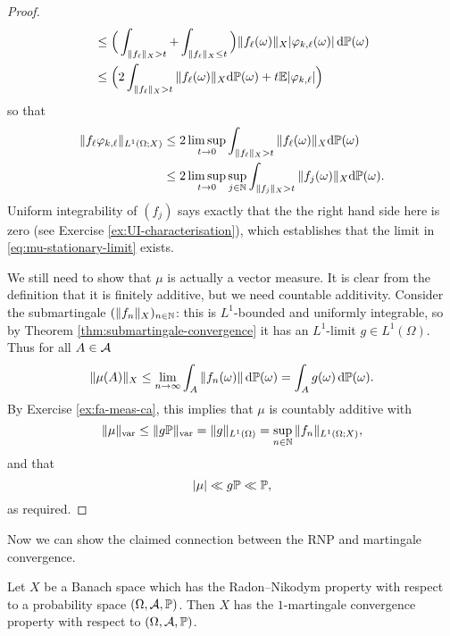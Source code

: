 \begin{proof}
\begin{equation*}
\begin{aligned}
       &\leq \Big( \int_{\|f_{\ell}\|_{X} > t} + \int_{\|f_{\ell}\|_{X} \leq t} \Big) \|f_{\ell}(\omega)\|_{X}|\phi_{k,\ell}(\omega)| \, \dd\P(\omega) \\
       &\leq \Big( 2\int_{\|f_{\ell}\|_{X} > t} \|f_{\ell}(\omega)\|_{X} \dd\P(\omega) + t\E|\phi_{k,\ell}| \Big)
     \end{aligned}
   \end{equation*}
   so that
   \begin{equation*}
     \begin{aligned}
       \|  f_\ell \phi_{k,\ell} \|_{L^1(\Omega;X)}
       &\leq 2\limsup_{t \to 0} \int_{\|f_{\ell}\|_{X} > t} \|f_{\ell}(\omega)\|_{X} \dd\P(\omega) \\
       &\leq 2\limsup_{t \to 0} \sup_{j \in \N}  \int_{\|f_{j}\|_{X} > t} \|f_{j}(\omega)\|_{X} \dd\P(\omega).
   \end{aligned}
 \end{equation*}
 Uniform integrability of $(f_j)$ says exactly that the the right hand side here is zero (see Exercise \ref{ex:UI-characterisation}), which establishes that the limit in \eqref{eq:mu-stationary-limit} exists.

 We still need to show that $\mu$ is actually a vector measure.
 It is clear from the definition that it is finitely additive, but we need countable additivity.
 Consider the submartingale $(\|f_n\|_{X})_{n \in \N}$: this is $L^1$-bounded and uniformly integrable, so by Theorem \ref{thm:submartingale-convergence} it has an $L^1$-limit $g \in L^1(\Omega)$.
 Thus for all $A \in \mc{A}$
 \begin{equation*}
   \|\mu(A)\|_{X} \leq \lim_{n \to \infty} \int_{A} \|f_n(\omega)\| \, \dd\P(\omega) = \int_{A} g(\omega) \, \dd\P(\omega).
 \end{equation*}
 By Exercise \ref{ex:fa-meas-ca}, this implies that $\mu$ is countably additive with
 \begin{equation*}
   \|\mu\|_{\var} \leq \|g\P\|_{\var} = \|g\|_{L^1(\Omega)} = \sup_{n \in \N} \|f_n\|_{L^1(\Omega;X)},
 \end{equation*}
 and that
 \begin{equation*}
   |\mu| \ll g\P \ll \P,
 \end{equation*}
 as required.
\end{proof}

Now we can show the claimed connection between the RNP and martingale convergence.

\begin{thm}
  Let $X$ be a Banach space which has the Radon--Nikodym property with respect to a probability space $(\Omega,\mc{A},\P)$.
  Then $X$ has the $1$-martingale convergence property with respect to $(\Omega,\mc{A},\P)$.
\end{thm}

